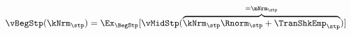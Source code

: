   \begin{equation}\begin{gathered}\begin{aligned}
\vBegStp(\kNrm_{\stp}) & = \Ex_{\BegStp}[\vMidStp(\overbrace{\kNrm_{\stp} \Rnorm_{\stp} + \TranShkEmp_{\stp}}^{=\mNrm_{\stp}})]  \label{eq:vBegStp}
      \end{aligned}\end{gathered}\end{equation}
